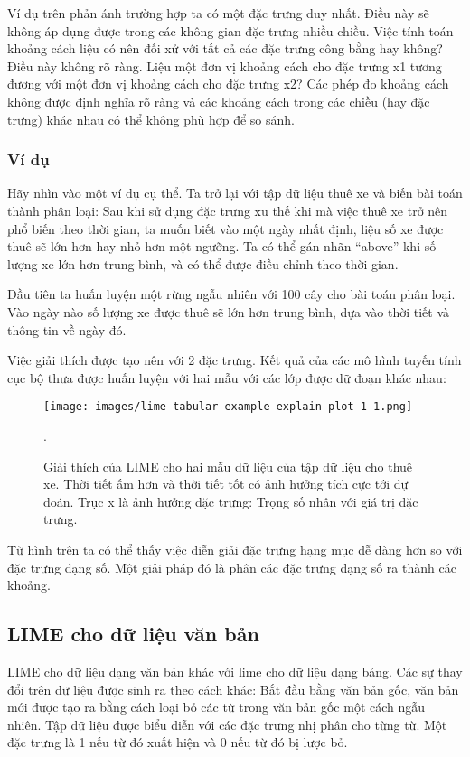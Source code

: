 Ví dụ trên phản ánh trường hợp ta có một đặc trưng duy nhất. Điều này sẽ không áp dụng được trong các không gian đặc trưng nhiều chiều. Việc tính toán khoảng cách liệu có nên đối xử với tất cả các đặc trưng công bằng hay không? Điều này không rõ ràng. Liệu một đơn vị khoảng cách cho đặc trưng x1 tương đương với một đơn vị khoảng cách cho đặc trưng x2? Các phép đo khoảng cách không được định nghĩa rõ ràng và các khoảng cách trong các chiều (hay đặc trưng) khác nhau có thể không phù hợp để so sánh.

\subsubsection{Ví dụ}

Hãy nhìn vào một ví dụ cụ thể. Ta trở lại với tập dữ liệu thuê xe và biến bài toán thành phân loại: Sau khi sử dụng đặc trưng xu thế khi mà việc thuê xe trở nên phổ biến theo thời gian, ta muốn biết vào một ngày nhất định, liệu số xe được thuê sẽ lớn hơn hay nhỏ hơn một ngưỡng. Ta có thể gán nhãn ``above'' khi số lượng xe lớn hơn trung bình, và có thể được điều chỉnh theo thời gian.

Đầu tiên ta huấn luyện một rừng ngẫu nhiên với 100 cây cho bài toán phân loại. Vào ngày nào số lượng xe được thuê sẽ lớn hơn trung bình, dựa vào thời tiết và thông tin về ngày đó.

Việc giải thích được tạo nên với 2 đặc trưng. Kết quả của các mô hình tuyến tính cục bộ thưa được huấn luyện với hai mẫu với các lớp được dữ đoạn khác nhau:

\begin{figure*}[h!]
	\centering
	\texttt{[image: images/lime-tabular-example-explain-plot-1-1.png]}
	\label{fig:5_35}
	\caption{Giải thích của LIME cho hai mẫu dữ liệu của tập dữ liệu cho thuê xe. Thời tiết ấm hơn và thời tiết tốt có ảnh hưởng tích cực tới dự đoán. Trục x là ảnh hưởng đặc trưng: Trọng số nhân với giá trị đặc trưng.}.
	
\end{figure*}

Từ hình trên ta có thể thấy việc diễn giải đặc trưng hạng mục dễ dàng hơn so với đặc trưng dạng số. Một giải pháp đó là phân các đặc trưng dạng số ra thành các khoảng.

\subsection{LIME cho dữ liệu văn bản}

LIME cho dữ liệu dạng văn bản khác với lime cho dữ liệu dạng bảng. Các sự thay đổi trên dữ liệu được sinh ra theo cách khác: Bắt đầu bằng văn bản gốc, văn bản mới được tạo ra bằng cách loại bỏ các từ trong văn bản gốc một cách ngẫu nhiên. Tập dữ liệu được biểu diễn với các đặc trưng nhị phân cho từng từ. Một đặc trưng là 1 nếu từ đó xuất hiện và 0 nếu từ đó bị lược bỏ.

